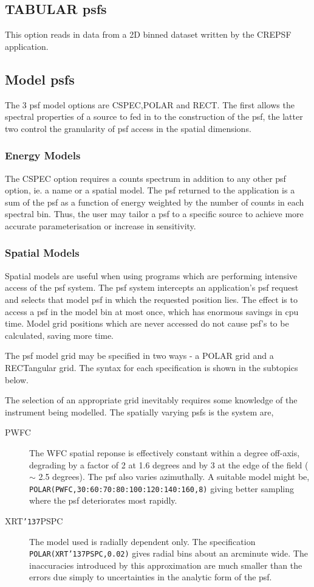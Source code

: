 \documentclass{book}
\renewcommand{\_}{{\tt\char'137}}     %
\begin{document}
\subsection{TABULAR psfs}
This option reads in data from a 2D binned dataset written by
the CREPSF application.
 
\subsection{Model psfs}
The 3 psf model options are CSPEC,POLAR and RECT. The first allows
the spectral properties of a source to fed in to the construction
of the psf, the latter two control the granularity of psf access in
the spatial dimensions.
 
\subsubsection{Energy Models}
The CSPEC option requires a counts spectrum in addition to any
other psf option, ie. a name or a spatial model. The psf returned
to the application is a sum of the psf as a function of energy
weighted by the number of counts in each spectral bin. Thus, the
user may tailor a psf to a specific source to achieve more
accurate parameterisation or increase in sensitivity.
 
\subsubsection{Spatial Models}
Spatial models are useful when using programs which are performing
intensive access of the psf system. The psf system intercepts an
application's psf request and selects that model psf in which the
requested position lies. The effect is to access a psf in the model
bin at most once, which has enormous savings in cpu time. Model
grid positions which are never accessed do not cause psf's to be
calculated, saving more time.
 
The psf model grid may be specified in two ways - a POLAR grid
and a RECTangular grid. The syntax for each specification is
shown in the subtopics below.
 
The selection of an appropriate grid inevitably requires some
knowledge of the instrument being modelled. The spatially
varying psfs is the system are,
 
 
\begin{description}
\item[PWFC]
The WFC spatial reponse is effectively constant
within a degree off-axis, degrading by a factor
of 2 at 1.6 degrees and by 3 at the edge of the
field ($\sim$ 2.5 degrees). The psf also varies
azimuthally. A suitable model might be,
{\tt POLAR(PWFC,30:60:70:80:100:120:140:160,8)}
giving better sampling where the psf deteriorates
most rapidly.
\item[XRT\_PSPC]
The model used is radially dependent only. The
specification {\tt POLAR(XRT\_PSPC,0.02)}
gives radial bins about an arcminute wide.
The inaccuracies introduced by this approximation
are much smaller than the errors due simply to
uncertainties in the analytic form of the psf.
\end{description}
\end{document}
